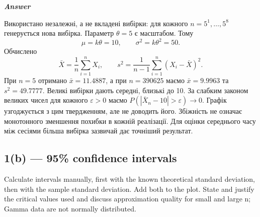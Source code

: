 \documentclass[11pt]{article}
\begin{document}
    \textbf{\emph{Answer}}

Використано незалежні, а не вкладені вибірки: для кожного
\(n=5^1,\ldots,5^8\) генерується нова вибірка. Параметр \(\theta=5\) є
масштабом. Тому \[\mu=k\theta=10,\qquad \sigma^2=k\theta^2=50.\]
Обчислено
\[\bar X=\frac1n\sum_{i=1}^nX_i,\qquad s^2=\frac1{n-1}\sum_{i=1}^n(X_i-\bar X)^2.\]
При \(n=5\) отримано \(\bar x=11.4887\), а при \(n=390625\) маємо
\(\bar x=9.9963\) та \(s^2=49.7777\). Великі вибірки дають середні,
близькі до 10. За слабким законом великих чисел для кожного
\(\varepsilon>0\) маємо \(P(|\bar X_n-10|>\varepsilon)\to0\). Графік
узгоджується з цим твердженням, але не доводить його. Збіжність не
означає монотонного зменшення похибки в кожній реалізації. Для оцінки
середнього часу між сесіями більша вибірка зазвичай дає точніший
результат.

    \subsection{1(b) --- 95\% confidence
intervals}\label{b-95-confidence-intervals}

Calculate intervals manually, first with the known theoretical standard
deviation, then with the sample standard deviation. Add both to the
plot. State and justify the critical values used and discuss
approximation quality for small and large n; Gamma data are not normally
distributed.
\end{document}
